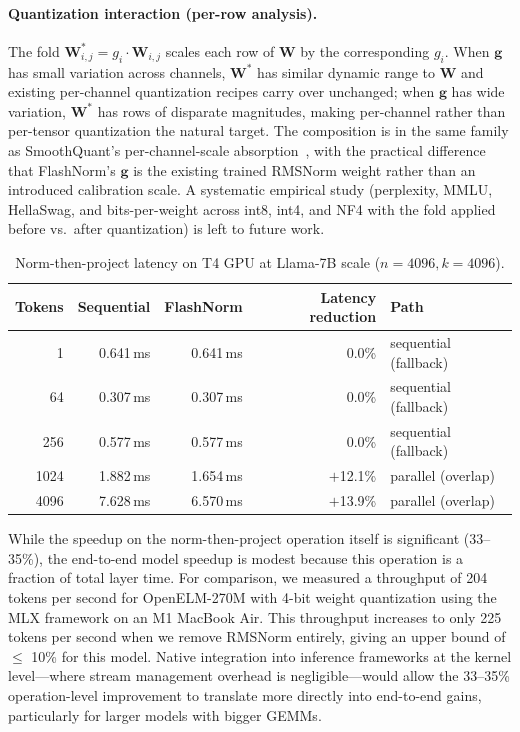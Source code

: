 \documentclass{article}
\begin{document}
\paragraph{Quantization interaction (per-row analysis).} The fold $\mathbf{W}^*_{i,j} = g_i \cdot \mathbf{W}_{i,j}$ scales each row of $\mathbf{W}$ by the corresponding $g_i$. When $\mathbf{g}$ has small variation across channels, $\mathbf{W}^*$ has similar dynamic range to $\mathbf{W}$ and existing per-channel quantization recipes carry over unchanged; when $\mathbf{g}$ has wide variation, $\mathbf{W}^*$ has rows of disparate magnitudes, making per-channel rather than per-tensor quantization the natural target. The composition is in the same family as SmoothQuant's per-channel-scale absorption~\citep{smoothQuant}, with the practical difference that FlashNorm's $\mathbf{g}$ is the existing trained RMSNorm weight rather than an introduced calibration scale. A systematic empirical study (perplexity, MMLU, HellaSwag, and bits-per-weight across int8, int4, and NF4 with the fold applied before vs.\ after quantization) is left to future work.

\begin{table}[h!] \centering
\caption{Norm-then-project latency on T4 GPU at Llama-7B scale ($n{=}4096, k{=}4096$).}
\label{tab:overlap7b}
\begin{tabular}{r r r r l}
\hline
Tokens & Sequential & FlashNorm & Latency reduction & Path \\
\hline
1      & 0.641\,ms & 0.641\,ms & $0.0$\% & sequential (fallback) \\
64     & 0.307\,ms & 0.307\,ms & $0.0$\% & sequential (fallback) \\
256    & 0.577\,ms & 0.577\,ms & $0.0$\% & sequential (fallback) \\
1024   & 1.882\,ms & 1.654\,ms & $+$12.1\% & parallel (overlap) \\
4096   & 7.628\,ms & 6.570\,ms & $+$13.9\% & parallel (overlap) \\
\hline
\end{tabular}
\end{table}

While the speedup on the norm-then-project operation itself is significant (33--35\%), the end-to-end model speedup is modest because this operation is a fraction of total layer time. For comparison, we measured a throughput of 204 tokens per second for OpenELM-270M with 4-bit weight quantization using the MLX framework on an M1 MacBook Air. This throughput increases to only 225 tokens per second when we remove RMSNorm entirely, giving an upper bound of $\leq$ 10\% for this model. Native integration into inference frameworks at the kernel level---where stream management overhead is negligible---would allow the 33--35\% operation-level improvement to translate more directly into end-to-end gains, particularly for larger models with bigger GEMMs.
\end{document}

